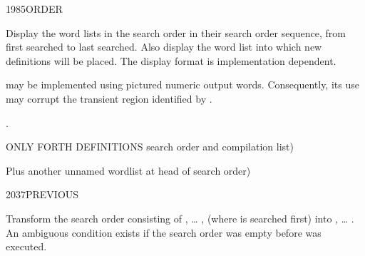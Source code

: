 \begin{worddef}{1985}{ORDER}
\item \stack{}{}

	Display the word lists in the search order in their search order
	sequence, from first searched to last searched. Also display the
	word list into which new definitions will be placed. The display
	format is implementation dependent.

	 may be implemented using pictured numeric output
	words. Consequently, its use may corrupt the transient region
	identified by .

\see {}.

	\begin{testing}\ttfamily
		  ONLY FORTH DEFINITIONS search order and compilation list)  \\

		  Plus another unnamed wordlist at head of search order)  \\
	\end{testing}
\end{worddef}


\begin{worddef}{2037}{PREVIOUS}
\item \stack{}{}

	Transform the search order consisting of , {\ldots}
	,  (where  is searched
	first) into , {\ldots} . An ambiguous
	condition exists if the search order was empty before
	 was executed.
\end{worddef}
